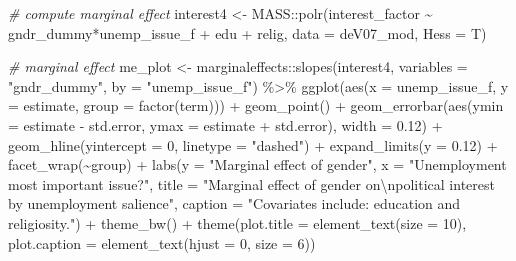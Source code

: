 \documentclass[
]{article}
\newenvironment{Shaded}{\begin{snugshade}}{\end{snugshade}}
\newcommand{\AttributeTok}[1]{\textcolor[rgb]{0.77,0.63,0.00}{#1}}
\newcommand{\CommentTok}[1]{\textcolor[rgb]{0.56,0.35,0.01}{\textit{#1}}}
\newcommand{\DecValTok}[1]{\textcolor[rgb]{0.00,0.00,0.81}{#1}}
\newcommand{\FloatTok}[1]{\textcolor[rgb]{0.00,0.00,0.81}{#1}}
\newcommand{\FunctionTok}[1]{\textcolor[rgb]{0.00,0.00,0.00}{#1}}
\newcommand{\NormalTok}[1]{#1}
\newcommand{\OtherTok}[1]{\textcolor[rgb]{0.56,0.35,0.01}{#1}}
\newcommand{\SpecialCharTok}[1]{\textcolor[rgb]{0.00,0.00,0.00}{#1}}
\newcommand{\StringTok}[1]{\textcolor[rgb]{0.31,0.60,0.02}{#1}}
\begin{document}
\begin{Shaded}
\begin{Highlighting}[]
\CommentTok{\# compute marginal effect}
\NormalTok{interest4 }\OtherTok{\textless{}{-}}\NormalTok{ MASS}\SpecialCharTok{::}\FunctionTok{polr}\NormalTok{(interest\_factor }\SpecialCharTok{\textasciitilde{}}\NormalTok{ gndr\_dummy}\SpecialCharTok{*}\NormalTok{unemp\_issue\_f }\SpecialCharTok{+}\NormalTok{ edu }\SpecialCharTok{+}\NormalTok{ relig, }
                 \AttributeTok{data =}\NormalTok{ deV07\_mod, }
                 \AttributeTok{Hess =}\NormalTok{ T)}

\CommentTok{\# marginal effect}
\NormalTok{me\_plot }\OtherTok{\textless{}{-}}\NormalTok{ marginaleffects}\SpecialCharTok{::}\FunctionTok{slopes}\NormalTok{(interest4, }
                        \AttributeTok{variables =} \StringTok{"gndr\_dummy"}\NormalTok{, }\AttributeTok{by =} \StringTok{"unemp\_issue\_f"}\NormalTok{) }\SpecialCharTok{\%\textgreater{}\%}
  \FunctionTok{ggplot}\NormalTok{(}\FunctionTok{aes}\NormalTok{(}\AttributeTok{x =}\NormalTok{ unemp\_issue\_f, }\AttributeTok{y =}\NormalTok{ estimate, }
             \AttributeTok{group =} \FunctionTok{factor}\NormalTok{(term))) }\SpecialCharTok{+}
  \FunctionTok{geom\_point}\NormalTok{() }\SpecialCharTok{+}
  \FunctionTok{geom\_errorbar}\NormalTok{(}\FunctionTok{aes}\NormalTok{(}\AttributeTok{ymin =}\NormalTok{ estimate }\SpecialCharTok{{-}}\NormalTok{ std.error, }\AttributeTok{ymax =}\NormalTok{ estimate }\SpecialCharTok{+}\NormalTok{ std.error),}
                \AttributeTok{width =} \FloatTok{0.12}\NormalTok{) }\SpecialCharTok{+}
  \FunctionTok{geom\_hline}\NormalTok{(}\AttributeTok{yintercept =} \DecValTok{0}\NormalTok{, }\AttributeTok{linetype =} \StringTok{"dashed"}\NormalTok{) }\SpecialCharTok{+}
  \FunctionTok{expand\_limits}\NormalTok{(}\AttributeTok{y =} \FloatTok{0.12}\NormalTok{) }\SpecialCharTok{+}
  \FunctionTok{facet\_wrap}\NormalTok{(}\SpecialCharTok{\textasciitilde{}}\NormalTok{group) }\SpecialCharTok{+}
  \FunctionTok{labs}\NormalTok{(}\AttributeTok{y =} \StringTok{"Marginal effect of gender"}\NormalTok{, }
       \AttributeTok{x =} \StringTok{"Unemployment most important issue?"}\NormalTok{,}
       \AttributeTok{title =} \StringTok{"Marginal effect of gender on}\SpecialCharTok{\textbackslash{}n}\StringTok{political interest by unemployment salience"}\NormalTok{,}
       \AttributeTok{caption =} \StringTok{"Covariates include: education and religiosity."}\NormalTok{) }\SpecialCharTok{+}
  \FunctionTok{theme\_bw}\NormalTok{() }\SpecialCharTok{+}
  \FunctionTok{theme}\NormalTok{(}\AttributeTok{plot.title =} \FunctionTok{element\_text}\NormalTok{(}\AttributeTok{size =} \DecValTok{10}\NormalTok{),}
        \AttributeTok{plot.caption =} \FunctionTok{element\_text}\NormalTok{(}\AttributeTok{hjust =} \DecValTok{0}\NormalTok{, }\AttributeTok{size =} \DecValTok{6}\NormalTok{)) }
\end{Highlighting}
\end{Shaded}
\end{document}
